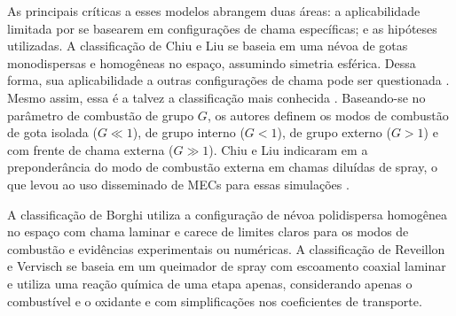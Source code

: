 As principais críticas a esses modelos abrangem duas áreas: a aplicabilidade limitada por se basearem em configurações de chama específicas; e as hipóteses utilizadas. 
A classificação de Chiu e Liu \cite{ChiuH1977,ChiuH1982} se baseia em uma névoa de gotas monodispersas e homogêneas no espaço, assumindo simetria esférica.
Dessa forma, sua aplicabilidade a outras configurações de chama pode ser questionada \cite{SacomanoF2017PhD}.
Mesmo assim, essa é a talvez a classificação mais conhecida \cite{JennyB2012}.
Baseando-se no parâmetro de combustão de grupo $G$, os autores definem  os modos de combustão de gota isolada ($G\ll1$), de grupo interno ($G<1$), de grupo externo ($G>1$) e com frente de chama externa ($G\gg1$).
Chiu e Liu indicaram em \cite{ChiuH1982} a preponderância do modo de combustão externa em chamas diluídas de spray, o que levou ao uso disseminado de MECs para essas simulações \cite{SacomanoF2017PhD}.

A classificação de Borghi \cite{Borghi1996} utiliza a configuração de névoa polidispersa homogênea no espaço com chama laminar e carece de limites claros para os modos de combustão e evidências experimentais ou numéricas.
A classificação de Reveillon e Vervisch  \cite{ReveillonJ2005} se baseia em um queimador de spray com escoamento coaxial laminar e utiliza uma reação química de uma etapa apenas, considerando apenas o combustível e o oxidante e com simplificações nos coeficientes de transporte.



